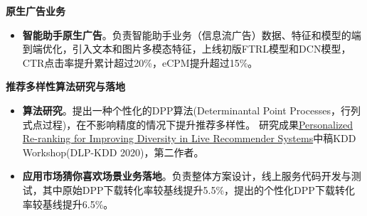 \documentclass{resume}
\begin{document}
\begin{onehalfspacing}
\begin{itemize}
\end{itemize}
\end{onehalfspacing}

\begin{onehalfspacing}
\textbf{原生广告业务}   
\begin{itemize}%
  \item \textbf{智能助手原生广告}。负责智能助手业务（信息流广告）数据、特征和模型的端到端优化，引入文本和图片多模态特征，上线初版FTRL模型和DCN模型，CTR点击率提升累计超过20\%，eCPM提升超过15\%。
\end{itemize}
\end{onehalfspacing}

\begin{onehalfspacing}
\textbf{推荐多样性算法研究与落地}   
\begin{itemize}%
  \item \textbf{算法研究}。提出一种个性化的DPP算法(Determinantal Point Processes，行列式点过程)，在不影响精度的情况下提升推荐多样性。
 研究成果\href{https://arxiv.org/abs/2004.06390}{Personalized Re-ranking for Improving Diversity in Live Recommender Systems}中稿KDD Workshop(DLP-KDD 2020)，第二作者。
  \item \textbf{应用市场猜你喜欢场景业务落地}。负责整体方案设计，线上服务代码开发与测试，其中原始DPP下载转化率较基线提升5.5\%，提出的个性化DPP下载转化率较基线提升6.5\%。
\end{itemize}
\end{onehalfspacing}

\end{document}
